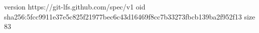 version https://git-lfs.github.com/spec/v1
oid sha256:5fcc9911e37e5c825f21977bec6c43d16469f8cc7b33273fbcb139ba2f952f13
size 83

